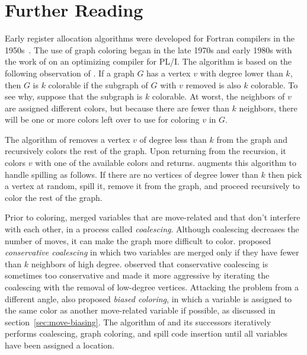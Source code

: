 \documentclass[7x10]{TimesAPriori_MIT}%
\numberwithin{theorem}{chapter}
\numberwithin{definition}{chapter}
\numberwithin{equation}{chapter}
\begin{document}


\section{Further Reading}
\label{sec:register-allocation-further-reading}

Early register allocation algorithms were developed for Fortran
compilers in the 1950s~\citep{Horwitz:1966aa,Backus:1978aa}.  The use
of graph coloring began in the late 1970s and early 1980s with the
work of \citet{Chaitin:1981vl} on an optimizing compiler for PL/I. The
algorithm is based on the following observation of
\citet{Kempe:1879aa}. If a graph $G$ has a vertex $v$ with degree
lower than $k$, then $G$ is $k$ colorable if the subgraph of $G$ with
$v$ removed is also $k$ colorable. To see why, suppose that the
subgraph is $k$ colorable.  At worst, the neighbors of $v$ are assigned
different colors, but because there are fewer than $k$ neighbors, there
will be one or more colors left over to use for coloring $v$ in $G$.

The algorithm of \citet{Chaitin:1981vl} removes a vertex $v$ of degree
less than $k$ from the graph and recursively colors the rest of the
graph. Upon returning from the recursion, it colors $v$ with one of
the available colors and returns.  \citet{Chaitin:1982vn} augments
this algorithm to handle spilling as follows. If there are no vertices
of degree lower than $k$ then pick a vertex at random, spill it,
remove it from the graph, and proceed recursively to color the rest of
the graph.

Prior to coloring, \citet{Chaitin:1981vl} merged variables that are
move-related and that don't interfere with each other, in a process
called \emph{coalescing}. Although coalescing decreases the number of
moves, it can make the graph more difficult to
color. \citet{Briggs:1994kx} proposed \emph{conservative coalescing} in
which two variables are merged only if they have fewer than $k$
neighbors of high degree. \citet{George:1996aa} observed that
conservative coalescing is sometimes too conservative and made it more
aggressive by iterating the coalescing with the removal of low-degree
vertices.
%
Attacking the problem from a different angle, \citet{Briggs:1994kx}
also proposed \emph{biased coloring}, in which a variable is assigned to
the same color as another move-related variable if possible, as
discussed in section~\ref{sec:move-biasing}.
%
The algorithm of \citet{Chaitin:1981vl} and its successors iteratively
performs coalescing, graph coloring, and spill code insertion until
all variables have been assigned a location.
\end{document}
